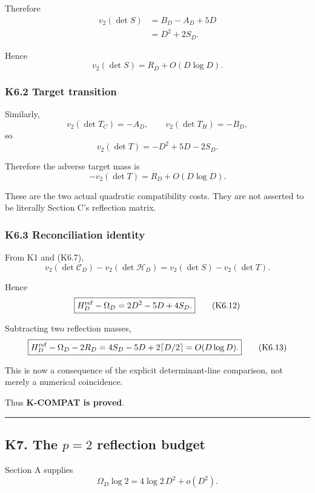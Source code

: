\documentclass[
  10pt,
  letterpaper,
]{article}
\theoremstyle{definition}
\theoremstyle{remark}
\begin{document}
Therefore \[
\begin{aligned}
v_2(\det S)
&=B_D-A_D+5D\\
&=\boxed{D^2+2S_D}.
\end{aligned}
\tag{K6.8}
\]

Hence \[
\boxed{
v_2(\det S)
=
R_D+O(D\log D).
}
\tag{K6.9}
\]

\subsubsection{K6.2 Target transition}\label{k6.2-target-transition}

Similarly, \[
v_2(\det T_C)=-A_D,
\qquad
v_2(\det T_H)=-B_D,
\] so \[
\boxed{
v_2(\det T)
=
-D^2+5D-2S_D.
}
\tag{K6.10}
\]

Therefore the adverse target mass is \[
\boxed{
-v_2(\det T)
=
R_D+O(D\log D).
}
\tag{K6.11}
\]

These are the two actual quadratic compatibility costs. They are not
asserted to be literally Section C's reflection matrix.

\subsubsection{K6.3 Reconciliation
identity}\label{k6.3-reconciliation-identity}

From K1 and (K6.7), \[
v_2(\det\mathcal C_D)-v_2(\det\mathcal H_D)
=
v_2(\det S)-v_2(\det T).
\]

Hence \[
\boxed{
H_D^{\rm ref}-\Omega_D
=
2D^2-5D+4S_D.
}
\tag{K6.12}
\]

Subtracting two reflection masses, \[
\boxed{
H_D^{\rm ref}-\Omega_D-2R_D
=
4S_D-5D+2\lceil D/2\rceil
=
O(D\log D).
}
\tag{K6.13}
\]

This is now a consequence of the explicit determinant-line comparison,
not merely a numerical coincidence.

Thus \textbf{K-COMPAT is proved}.

\begin{center}\rule{0.5\linewidth}{0.5pt}\end{center}

\subsection{\texorpdfstring{K7. The \(p=2\) reflection
budget}{K7. The p=2 reflection budget}}\label{k7.-the-p2-reflection-budget}

Section A supplies \[
\Omega_D\log2
=
4\log2\,D^2+o(D^2).
\]
\end{document}
